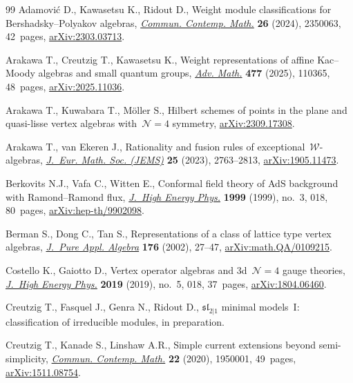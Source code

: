 \documentclass[pdftex]{sigma}
\numberwithin{equation}{section}
\begin{document}
\begin{thebibliography}{99}
Adamovi\'c D., Kawasetsu K., Ridout D., Weight module classifications for
 {B}ershadsky--{P}olyakov algebras,
 \href{https://doi.org/10.1142/S0219199723500633}{\textit{Commun. Contemp.
 Math.}} \textbf{26} (2024), 2350063, 42~pages,
 \href{http://arxiv.org/abs/2303.03713}{arXiv:2303.03713}.

Arakawa T., Creutzig T., Kawasetsu K., Weight representations of affine
 {K}ac--{M}oody algebras and small quantum groups,
 \href{https://doi.org/10.1016/j.aim.2025.110365}{\textit{Adv. Math.}}
 \textbf{477} (2025), 110365, 48~pages,
 \href{http://arxiv.org/abs/2025.11036}{arXiv:2025.11036}.

Arakawa T., Kuwabara T., M\"oller S., Hilbert schemes of points in the plane
 and quasi-lisse vertex algebras with~{$\mathcal{N}=4$} symmetry,
 \href{http://arxiv.org/abs/2309.17308}{arXiv:2309.17308}.

Arakawa T., van Ekeren J., Rationality and fusion rules of
 exceptional~{$\mathcal {W}$}-algebras,
 \href{https://doi.org/10.4171/jems/1250}{\textit{J.~Eur. Math. Soc. (JEMS)}}
 \textbf{25} (2023), 2763--2813,
 \href{http://arxiv.org/abs/1905.11473}{arXiv:1905.11473}.

Berkovits N.J., Vafa C., Witten E., Conformal field theory of {A}d{S}
 background with {R}amond--{R}amond flux,
 \href{https://doi.org/10.1088/1126-6708/1999/03/018}{\textit{J.~High Energy
 Phys.}} \textbf{1999} (1999), no.~3, 018, 80~pages,
 \href{http://arxiv.org/abs/hep-th/9902098}{arXiv:hep-th/9902098}.

Berman S., Dong C., Tan S., Representations of a class of lattice type vertex
 algebras,
 \href{https://doi.org/10.1016/S0022-4049(02)00053-1}{\textit{J.~Pure Appl.
 Algebra}} \textbf{176} (2002), 27--47,
 \href{http://arxiv.org/abs/math.QA/0109215}{arXiv:math.QA/0109215}.

Costello K., Gaiotto D., Vertex operator algebras and 3d~{$\mathcal N=4$}
 gauge theories,
 \href{https://doi.org/10.1007/jhep05(2019)018}{\textit{J.~High Energy Phys.}}
 \textbf{2019} (2019), no.~5, 018, 37~pages,
 \href{http://arxiv.org/abs/1804.06460}{arXiv:1804.06460}.

Creutzig T., Fasquel J., Genra N., Ridout D., $\mathfrak{sl}_{2\vert1}$ minimal
 models~{I}: classification of irreducible modules, {i}n preparation.

Creutzig T., Kanade S., Linshaw A.R., Simple current extensions beyond
 semi-simplicity,
 \href{https://doi.org/10.1142/S0219199719500019}{\textit{Commun. Contemp.
 Math.}} \textbf{22} (2020), 1950001, 49~pages,
 \href{http://arxiv.org/abs/1511.08754}{arXiv:1511.08754}.


\end{thebibliography}
\end{document}
